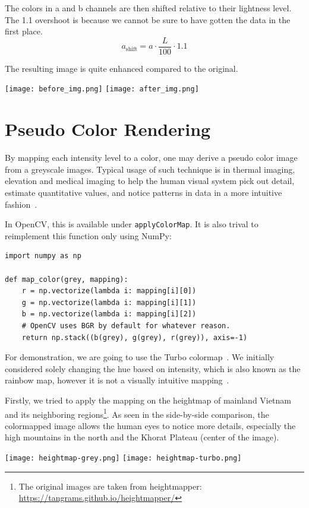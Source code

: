 \documentclass[a4paper,12pt]{article}
\begin{document}
The colors in a and b channels are then shifted relative to their lightness
level. The 1.1 overshoot is because we cannot be sure to have gotten the data
in the first place.
\[a_\mathrm{shift} = a \cdot \frac{L}{100} \cdot 1.1\]

The resulting image is quite enhanced compared to the original.
\begin{center}
  \texttt{[image: before\_img.png]}
  \texttt{[image: after\_img.png]}
\end{center}

\section{Pseudo Color Rendering}
By mapping each intensity level to a color, one may derive a pseudo color image
from a greyscale images.  Typical usage of such technique is in thermal imaging,
elevation and medical imaging to help the human visual system pick out detail,
estimate quantitative values, and notice patterns in data in a more intuitive
fashion~\cite{turbo}.

In OpenCV, this is available under \verb|applyColorMap|.  It is also trival
to reimplement this function only using NumPy:
\begin{verbatim}
import numpy as np

def map_color(grey, mapping):
    r = np.vectorize(lambda i: mapping[i][0])
    g = np.vectorize(lambda i: mapping[i][1])
    b = np.vectorize(lambda i: mapping[i][2])
    # OpenCV uses BGR by default for whatever reason.
    return np.stack((b(grey), g(grey), r(grey)), axis=-1)
\end{verbatim}

For demonstration, we are going to use the Turbo colormap~\cite{turbo}.
We initially considered solely changing the hue based on intensity,
which is also known as the rainbow map, however it is not a visually
intuitive mapping~\cite{rainbowbad}.

Firstly, we tried to apply the mapping on the heightmap of mainland Vietnam and
its neighboring regions\footnote{The original images are taken from
heightmapper: \url{https://tangrams.github.io/heightmapper/}}.  As seen in
the side-by-side comparison, the colormapped image allows the human eyes
to notice more details, especially the high mountains in the north and
the Khorat Plateau (center of the image).
\begin{center}
  \texttt{[image: heightmap-grey.png]}
  \texttt{[image: heightmap-turbo.png]}
\end{center}
\end{document}
